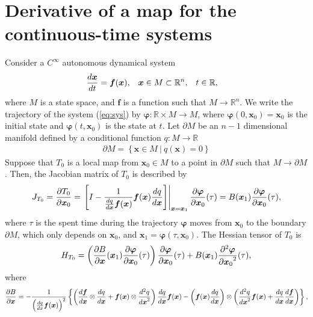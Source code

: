 \documentclass[a4paper]{article}
\newcommand{\R}{\mathbb{R}}
\newcommand{\deriv}[3][1]{%
    \ifthenelse{\equal{#1}{1}}{\frac{d #2}{d #3}}{\frac{d^#1 #2}{{d #3}^#1}}
}
\newcommand{\pderiv}[3][1]{%
    \ifthenelse{\equal{#1}{1}}{\frac{\partial #2}{\partial #3}}{\frac{\partial^#1 #2}{{\partial #3}^#1}}
}
\newcommand{\jac}{J}
\newcommand{\hes}{H}
\newcommand{\parens}[1]{\left(#1\right)}
\newcommand{\braces}[1]{\left\{#1\right\}}
\newcommand{\set}[1]{\braces{#1}}
\newcommand{\parm}{\partial\!M}
\newcommand{\brackets}[1]{\left[#1\right]}
\newcommand{\traj}{\bm \varphi}
\begin{document}
\section{Derivative of a map for the continuous-time systems}
Consider a $C^{\infty}$ autonomous dynamical system
\begin{align}
    \begin{aligned}
        \deriv{\bm x}{t} &= \bm f(\bm x), &
        \bm x &\in M \subset \R^n, &
        t &\in \R,
    \end{aligned}
    \label{eq:sys}
\end{align}
where $M$ is a state space, and $\bm f$ is a function such that $M \to \R^n$.
We write the trajectory of the system (\ref{eq:sys}) by $\traj: \R \times M \to M$,
where $\traj(0, \bm x_0) = \bm x_0$ is the initial state
and $\traj(t, \bm x_0)$ is the state at $t$.
Let $\parm$ be an $n-1$ dimensional manifold defined by
a conditional function $q: M \to \R$
\begin{align}
    \parm = \set{
        \bm x \in M ~|~
        q(\bm x) = 0
    }
\end{align}
Suppose that $T_0$ is a local map from $\bm x_0 \in M$ to a point in $\parm$
such that $M \to \parm$.
Then, the Jacobian matrix of $T_0$ is described by
\begin{align}
    \jac_{T_0} = \pderiv{T_0}{\bm x_0} =
    \left.
    \brackets{
        I -
        \frac{1}{\deriv{q}{\bm x} \bm f(\bm x)}
        \bm f(\bm x) \deriv{q}{\bm x}
    }
    \right|_{\bm x = \bm x_1}
    \pderiv{\traj}{\bm x_0}(\tau)
    =
    B(\bm x_1) \pderiv{\traj}{\bm x_0}(\tau),
\end{align}
where $\tau$ is the spent time during the trajectory $\traj$
moves from $\bm x_0$ to the boundary $\parm$, which only depends on $\bm x_0$,
and $\bm x_1 = \traj(\tau, \bm x_0)$.
The Hessian tensor of $T_0$ is
\begin{align}
    \hes_{T_0}
    =
    \parens{
        \pderiv{B}{\bm x} (\bm x_1) \pderiv{\traj}{\bm x_0}(\tau)
    }
    \pderiv{\traj}{\bm x_0}(\tau)
    +
    B(\bm x_1) \pderiv[2]{\traj}{\bm x_0}(\tau),
\end{align}
where
\begin{align}
    \pderiv{B}{\bm x}
    =
    - \frac{1}{
        \parens{\deriv{q}{x} \bm f(\bm x)}^2
    }
    \braces{
        \parens{
            \deriv{\bm f}{\bm x} \otimes \deriv{q}{\bm x}
            +
            \bm f(\bm x) \otimes \deriv[2]{q}{\bm x}
        }
        \deriv{q}{\bm x} \bm f(\bm x)
        -
        \parens{\bm f(\bm x) \deriv{q}{\bm x}} \otimes
        \parens{
            \deriv[2]{q}{\bm x} \bm f(\bm x)
            +
            \deriv{q}{\bm x} \deriv{\bm f}{\bm x}
        }
    },
\end{align}
\end{document}
